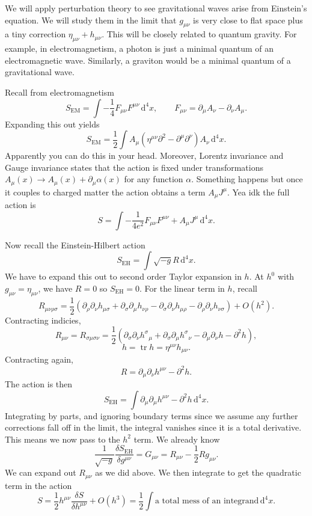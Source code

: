 
We will apply perturbation theory to see gravitational waves arise from Einstein's equation. We will study them in the limit that $g_{\mu \nu } $ is very close to flat space plus a tiny correction $\eta _{\mu \nu } +h_{\mu \nu } $. This will be closely related to quantum gravity. For example, in electromagnetism, a photon is just a minimal quantum of an electromagnetic wave. Similarly, a graviton would be a minimal quantum of a gravitational wave.

Recall from electromagnetism
\[
	S_\mathrm{EM} =\int -\frac{1}{4} F_{\mu \nu } F^{\mu \nu }  \,\mathrm{d} ^4x,\qquad F_{\mu \nu } =\partial _\mu A_\nu -\partial _\nu A_\mu 
.\]
Expanding this out yields
\[
	S_{\mathrm{EM} } =\frac{1}{2} \int A_\mu \left( \eta ^{\mu \nu } \partial ^2-\partial ^\mu \partial ^\nu  \right) A_\nu  \,\mathrm{d} ^4x
.\]
Apparently you can do this in your head. Moreover, Lorentz invariance and Gauge invariance states that the action is fixed under transformations $A_\mu(x) \to A_\mu(x) +\partial _\mu \alpha (x)$ for any function $\alpha $. Something happens but once it couples to charged matter the action obtains a term $A_\mu J^\mu $. Yea idk the full action is
\[
	S=\int -\frac{1}{4e^2} F_{\mu \nu } F^{\mu \nu } +A_\mu J^\mu  \,\mathrm{d} ^4x
.\]

Now recall the Einstein-Hilbert action
\[
	S_{\mathrm{EH} } =\int \sqrt{-g} R \,\mathrm{d} ^4x
.\]
We have to expand this out to second order Taylor expansion in $h$. At $h^0$ with $g_{\mu \nu } =\eta _{\mu \nu } $, we have $R=0$ so $S_{\mathrm{EH} } =0$. For the linear term in $h$, recall
\[
	R_{\mu \nu \rho \sigma } =\frac{1}{2} \left( \partial _\rho \partial _\nu h_{\mu \sigma } +\partial _\sigma \partial _\mu h_{\nu \rho } -\partial _\sigma \partial _\nu h_{\mu \rho } -\partial _\rho \partial _\nu h_{\nu \sigma }  \right) +O(h^2)
.\]
Contracting indicies,
\[
	R_{\mu \nu } =R_{\sigma \mu \sigma \nu }=\frac{1}{2} \left( \partial _\sigma \partial _\nu h^\sigma\!_\mu +\partial _\sigma \partial _\mu h^\sigma \!_\nu -\partial _\mu \partial _\nu h - \partial ^2h \right) ,
\]
\[
	h=\operatorname{tr} h = \eta^{\mu \nu } h_{\mu \nu } 
.\]
Contracting again,
\[
	R=\partial _\mu \partial _\nu h^{\mu \nu } -\partial ^2h
.\]
The action is then
\[
	S_{\mathrm{EH} } =\int \partial _\mu \partial _\mu h^{\mu \nu } -\partial ^2h \,\mathrm{d} ^4x
.\]
Integrating by parts, and ignoring boundary terms since we assume any further corrections fall off in the limit, the integral vanishes since it is a total derivative. This means we now pass to the $h^2$ term. We already know
\[
	\frac{1}{\sqrt{-g} } \frac{\delta S_{\mathrm{EH} } }{\delta g^{\mu \nu } } =G_{\mu \nu } =R_{\mu \nu } -\frac{1}{2} Rg_{\mu \nu } 
.\]
We can expand out $R_{\mu \nu } $ as we did above. We then integrate to get the quadratic term in the action
\[
	S=\frac{1}{2} h^{\mu \nu } \frac{\delta S}{\delta h^{\mu \nu } } +O(h^3)=\frac{1}{2} \int \text{a total mess of an integrand}  \,\mathrm{d} ^4x
.\]


